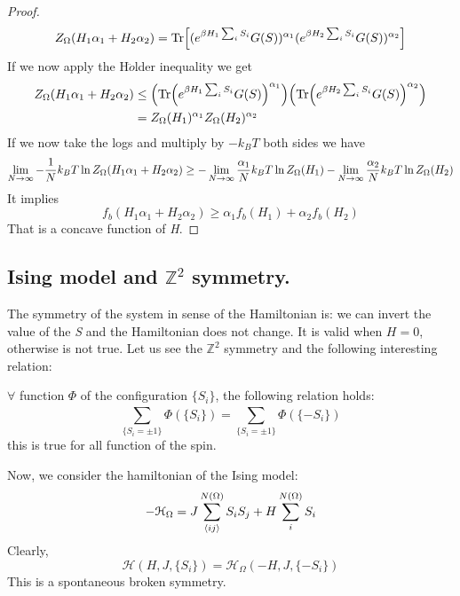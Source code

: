 \documentclass[../main/main.tex]{subfiles}
\begin{document}
\begin{proof}
\begin{equation}
    Z_ \Omega  (H_1 \alpha _1 + H_2 \alpha _2)   = \Tr[ (e^{\beta H_1 \sum_{i}^{} S_i } G (S))^{\alpha _1} (e^{\beta H_2 \sum_{i}^{} S_i } G (S))^{\alpha _2}]
\end{equation}
If we now apply the H$\ddot{o}$lder inequality we get
\begin{equation}
\begin{split}
    Z_ \Omega  (H_1 \alpha _1 + H_2 \alpha _2) & \le \qty(\Tr (e^{\beta H_1 \sum_{i}^{} S_i } G(S))^{\alpha _1}  ) \qty(\Tr (e^{\beta H_2 \sum_{i}^{} S_i } G (S))^{\alpha _2}  ) \\
    & = Z_ \Omega (H_1)^{\alpha _1} Z_ \Omega (H_2)^{\alpha _2}
\end{split}
\end{equation}
If we now take the logs and multiply by \( -k_B T \) both sides we have
\begin{equation}
  \lim_{N \rightarrow \infty } - \frac{1}{N} k_B T \ln{Z_ \Omega (H_1 \alpha _1 + H_2 \alpha _2)}  \ge
   - \lim_{N \rightarrow \infty } \frac{\alpha _1}{N} k_B T \ln{Z_ \Omega  (H_1 )} -
    \lim_{N \rightarrow \infty } \frac{\alpha _2}{N} k_B T \ln{Z_ \Omega  (H_2 )}  \\
\end{equation}
It implies
\begin{equation}
  f_b (H_1 \alpha _1 + H_2 \alpha _2) \ge \alpha _1 f_b (H_1 ) +  \alpha _2 f_b (H_2)
\end{equation}
That is a concave function of \emph{H}.
\end{proof}
\subsection{Ising model and \( \mathbb{Z}^2 \) symmetry. }
The symmetry of the system in sense of the Hamiltonian is: we can invert the value of the \emph{S} and the Hamiltonian does not change. It is valid when \( H=0 \), otherwise is not true. Let us see the \( \mathbb{Z}^2 \) symmetry and the following interesting relation:
\begin{orangebox}
  \begin{lemma}[]
  \( \forall  \) function \( \Phi  \) of the configuration \( \{ S_i \}   \), the following relation holds:
  \begin{equation}
    \sum_{ \{S_i = \pm 1\}}^{}  \Phi  (\{S_i\} ) =   \sum_{ \{S_i = \pm 1\}}^{}  \Phi  (\{-S_i\} )
      \label{eq:6_1}
  \end{equation}
  this is true for all function of the spin.
  \end{lemma}
\end{orangebox}
Now, we consider the hamiltonian of the Ising model:
\begin{equation*}
  - \mathcal{H}_ \Omega  = J \sum_{\expval{ij} }^{N(\Omega )} S_i S_j + H \sum_{i}^{N(\Omega )} S_i
\end{equation*}
Clearly,
\begin{equation}
  \mathcal{H}(H,J, \{S_i\}) =   \mathcal{H}_ \Omega (-H,J, \{-S_i\})
  \label{eq:6_1_1}
\end{equation}
This is a spontaneous broken symmetry.
\end{document}
